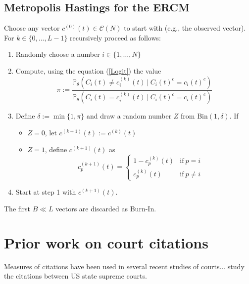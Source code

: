 \documentclass[headsepline=true, abstracton]{scrartcl}
\begin{document}
\subsection*{Metropolis Hastings for the ERCM}\label{networksimulation}
Choose any vector $c^{(0)}(t) \in \mathcal{C}(N)$ to start with (e.g., the observed vector). For $k \in \{0,...,L-1\}$ recursively proceed as follows:\\
\begin{enumerate}
\item Randomly choose a number $i\in \{1,\dots, N\}$
\item Compute, using the equation (\ref{Logit}) the value
$$\pi := \dfrac{\mathbb{P}_{\theta}(C_{i}(t) \neq c_{i}^{(k)}(t) ~| ~C_i(t)^c=c_i(t)^c)}{\mathbb{P}_{\theta}(C_{i}(t) = c_{i}^{(k)}(t) ~| ~C_i(t)^c=c_i(t)^c)}$$
\item Define $\delta:= \min\{1, \pi\}$ and draw a random number $Z$ from Bin$(1, \delta)$. If
\begin{itemize}
\item $Z=0$, let $c^{(k+1)}(t) := c^{(k)}(t)$ 
\item $Z=1$, define $c^{(k+1)}(t)$ as
$$c_{p}^{(k+1)}(t)=\begin{cases}
1-c_{p}^{(k)}(t)& \text{if}~ p=i \\
c_{p}^{(k)}(t) &\text{if}~ p \neq i 
\end{cases}$$
\end{itemize}
\item Start at step 1 with $c^{(k+1)}(t)$.
\end{enumerate}
The first $B \ll L$ vectors are discarded as Burn-In.



\section{Prior work on court citations}

Measures of citations have been used in several recent studies of courts...\citet{hinkle2016transmission} study the citations between US state supreme courts.
\end{document}
